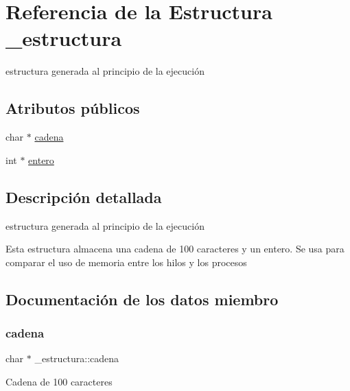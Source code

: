 \hypertarget{struct__estructura}{}\section{Referencia de la Estructura \+\_\+estructura}
\label{struct__estructura}


estructura generada al principio de la ejecución  


\subsection*{Atributos públicos}
\begin{DoxyCompactItemize}
\item 
char $\ast$ \mbox{\hyperlink{struct__estructura_a29bf54eee61a6cc3369758a5ee0cd1fa}{cadena}}
\item 
int $\ast$ \mbox{\hyperlink{struct__estructura_a7fefe0e76b29d4f973ce0a45c7fed838}{entero}}
\end{DoxyCompactItemize}


\subsection{Descripción detallada}
estructura generada al principio de la ejecución 

Esta estructura almacena una cadena de 100 caracteres y un entero. Se usa para comparar el uso de memoria entre los hilos y los procesos 

\subsection{Documentación de los datos miembro}
\mbox{\label{struct__estructura_a29bf54eee61a6cc3369758a5ee0cd1fa}} 
\subsubsection{\texorpdfstring{cadena}{cadena}}
{\footnotesize\ttfamily char $\ast$ \+\_\+estructura\+::cadena}

Cadena de 100 caracteres \mbox{\label{struct__estructura_a7fefe0e76b29d4f973ce0a45c7fed838}} 
